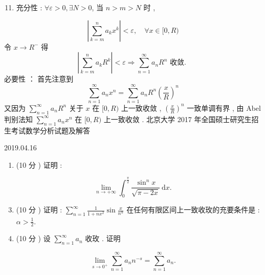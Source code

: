 \documentclass[10pt]{article}
\begin{document}
\begin{enumerate}
  \setcounter{enumi}{10}
  \item  充分性 : $\forall \varepsilon>0, \exists N>0$,  当  $n>m>N$  时 ,
\end{enumerate}
$$
\left|\sum_{k=m}^{n} a_{k} x^{k}\right|<\varepsilon, \quad \forall x \in[0, R)
$$
 令  $x \rightarrow R^{-}$ 得 
$$
\left|\sum_{k=m}^{n} a_{k} R^{k}\right|<\varepsilon \Longrightarrow \sum_{n=1}^{\infty} a_{n} R^{n} \text { 收敛. }
$$
 必要性 ： 首先注意到 
$$
\sum_{n=1}^{\infty} a_{n} x^{n}=\sum_{n=1}^{\infty} a_{n} R^{n}\left(\frac{x}{R}\right)^{n}
$$
 又因为  $\sum_{n=1}^{\infty} a_{n} R^{n}$  关于  $x$  在  $[0, R)$  上一致收敛 , $\left(\frac{x}{R}\right)^{n}$  一致单调有界 ,  由  Abel  判别法知  $\sum_{n=1}^{\infty} a_{n} x^{n}$  在  $[0, R)$  上一致收敛 .  北京大学  2017  年全国硕士研究生招生考试数学分析试题及解答     

2019.04.16

\begin{enumerate}
  \item (10  分 )  证明 :
\end{enumerate}
$$
\lim _{n \rightarrow+\infty} \int_{0}^{\frac{\pi}{2}} \frac{\sin ^{n} x}{\sqrt{\pi-2 x}} \mathrm{~d} x .
$$

\begin{enumerate}
  \setcounter{enumi}{2}
  \item (10  分 )  证明 : $\sum_{n=1}^{\infty} \frac{1}{1+n x^{2}} \sin \frac{x}{n^{\alpha}}$  在任何有限区间上一致收玫的充要条件是 : $\alpha>\frac{1}{2}$.

  \item (10  分 )  设  $\sum_{n=1}^{\infty} a_{n}$  收玫 .  证明 

\end{enumerate}
$$
\lim _{s \rightarrow 0^{+}} \sum_{n=1}^{\infty} a_{n} n^{-s}=\sum_{n=1}^{\infty} a_{n} .
$$
\end{document}
